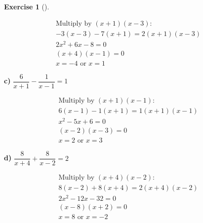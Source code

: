 \documentclass[
  letterpaper,
  DIV=11,
  numbers=noendperiod]{scrreprt}
\theoremstyle{definition}
\newtheorem{exercise}{Exercise}[chapter]
\theoremstyle{remark}
\begin{document}
\begin{exercise}[]
\begin{tcolorbox}
\begin{align*}
\text{Multiply by } (x + 1)(x - 3): \\ -3(x - 3) - 7(x + 1) = 2(x + 1)(x - 3) \\ 2x^2 + 6x - 8 = 0 \\ (x + 4)(x -1) = 0 \\ x = -4 \text{ or } x = 1
\end{align*}

\textbf{c)} \(\displaystyle \dfrac{6}{x + 1} - \dfrac{1}{x - 1} = 1\)

\begin{align*}
\text{Multiply by } (x + 1)(x - 1): \\ 6(x - 1) - 1(x + 1) = 1(x + 1)(x - 1) \\ x^2 - 5x + 6 = 0 \\ (x -2)(x -3) = 0 \\ x = 2 \text{ or } x = 3
\end{align*}

\textbf{d)} \(\displaystyle \dfrac{8}{x + 4} + \dfrac{8}{x - 2} = 2\)

\begin{align*}
\text{Multiply by } (x + 4)(x - 2): \\ 8(x - 2) + 8(x + 4) = 2(x + 4)(x - 2) \\ 2x^2 - 12x - 32 = 0 \\ (x -8)(x + 2) = 0 \\ x = 8 \text{ or } x = -2
\end{align*}

\end{tcolorbox}

\end{exercise}
\end{document}
